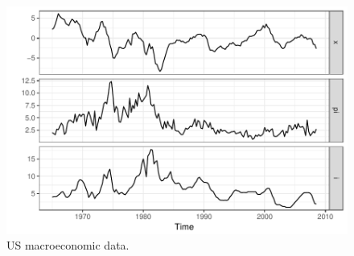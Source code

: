 \documentclass[nojss]{jss}\usepackage[]{graphicx}\usepackage[]{color}
\begin{document}
\begin{figure}[h]
\center
\includegraphics[scale=1]{Figures/USA_data}
\caption{US macroeconomic data.}
\label{fig:USA}
\end{figure}
\end{document}
